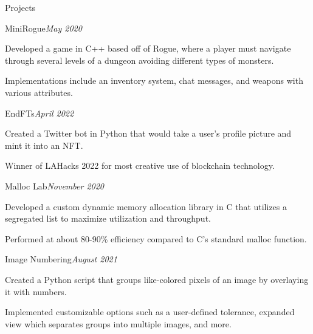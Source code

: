 \documentclass{resume} %
\begin{document}

\begin{rSection}{Projects}

\begin{rSubsection}{MiniRogue}{\em May 2020}{}{}
\item Developed a game in C++ based off of Rogue, where a player must navigate through several levels of a dungeon avoiding different types of monsters.
\item Implementations include an inventory system, chat messages, and weapons with various attributes.
\end{rSubsection}

\begin{rSubsection}{EndFTs}{\em April 2022}{}{}
\item Created a Twitter bot in Python that would take a user's profile picture and mint it into an NFT.
\item Winner of LAHacks 2022 for most creative use of blockchain technology.
\end{rSubsection}

\begin{rSubsection}{Malloc Lab}{\em November 2020}{}{}
\item Developed a custom dynamic memory allocation library in C that utilizes a segregated list to maximize utilization and throughput.
\item Performed at about 80-90\% efficiency compared to C's standard malloc function.
\end{rSubsection}

\begin{rSubsection}{Image Numbering}{\em August 2021}{}{}
\item Created a Python script that groups like-colored pixels of an image by overlaying it with numbers.
\item Implemented customizable options such as a user-defined tolerance, expanded view which separates groups into multiple images, and more.
\end{rSubsection}



\end{rSection}
\end{document}
